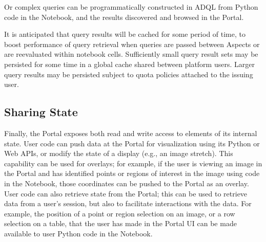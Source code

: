 Or complex queries can be programmatically constructed in ADQL from Python code in the Notebook, and the results discovered and browsed in the Portal.

It is anticipated that query results will be cached for some period of time, to boost performance of query retrieval when queries are passed between Aspects or are reevaluated within notebook cells.
Sufficiently small query result sets may be persisted for some time in a global cache shared between platform users.
Larger query results may be persisted subject to quota policies attached to the issuing user.

\subsection{Sharing State}\label{sharing-state}

Finally, the Portal exposes both read and write access to elements of its internal state.
User code can push data at the Portal for visualization using its Python or Web APIs, or modify the state of a display (e.g., an image stretch).
This capability can be used for overlays; for example, if the user is viewing an image in the Portal and has identified points or regions of interest in the image using code in the Notebook, those coordinates can be pushed to the Portal as an overlay.
User code can also retrieve state from the Portal; this can be used to retrieve data from a user's session, but also to facilitate interactions with the data.
For example, the position of a point or region selection on an image, or a row selection on a table, that the user has made in the Portal UI can be made available to user Python code in the Notebook.
